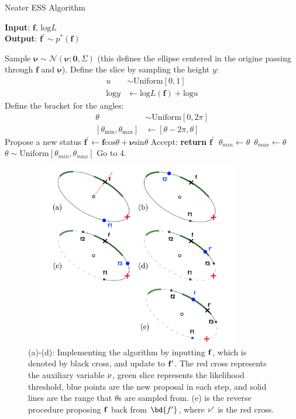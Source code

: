 \documentclass{article}
\begin{document}
\begin{algorithm}
\caption{Neater ESS Algorithm}\label{ess*}
\hspace*{\algorithmicindent} \textbf{Input}: $\mathbf{f},\,\text{log}L$ \\
\hspace*{\algorithmicindent} \textbf{Output}: $\mathbf{f^'}\sim p^*(\mathbf{f})$ 
\begin{algorithmic}[1]
\State Sample $\pmb{\nu}\sim\mathcal{N}(\pmb{\nu};\mathbf{0},\Sigma)$ (this defines the ellipse centered in the origine passing through $\mathbf{f}$ and $\pmb{\nu}$).
\State Define the slice by sampling the height $y$:
\begin{align*}
u &\sim\text{Uniform}[0,1]\\
\text{log}y &\leftarrow \text{log}L(\mathbf{f})+\text{log}u
\end{align*}
\State Define the bracket for the angles:
\begin{align*}
\theta &\sim\text{Uniform}[0,2\pi]\\
[\theta_{\text{min}},\theta_{\text{max}}]&\leftarrow [\theta-2\pi,\theta]
\end{align*}
\State Propose a new status $\mathbf{f^{'}}\leftarrow\mathbf{f}\text{cos}\theta+\pmb{\nu}\text{sin}\theta$
    \State Accept: \textbf{return} $\mathbf{f^{'}}$
     $\,\theta_{min}\leftarrow\theta$ 
    \Else $\,\theta_{max}\leftarrow\theta$
  \State $\theta\sim\text{Uniform}[\theta_{min}, \theta_{max}]$
  \State Go to 4.
\end{algorithmic}
\end{algorithm}

\begin{figure}
    \centering
    \includegraphics[width = 10cm,height = 8cm]{essfig.png}
    \caption{(a)-(d): Implementing the algorithm by inputting $\bf{f}$, which is denoted by black cross, and update to $\bf{f'}$. The red cross represents the auxiliary variable $\bf{\nu}$, green slice represents the likelihood threshold, blue points are the new proposal in each step, and solid lines are the range that $\theta$s are sampled from. (e) is the reverse procedure proposing $\bf{f}$ back from $\bd{f'}$, where $\bf{\nu'}$ is the red cross.}
\end{figure}
\end{document}
